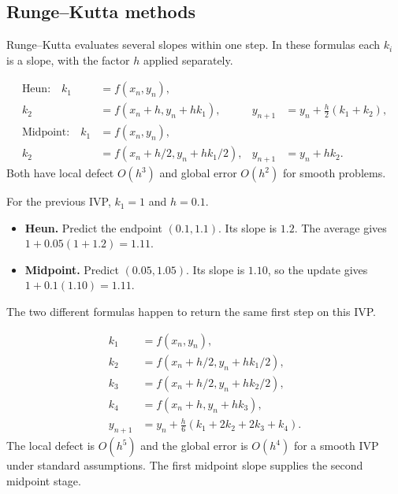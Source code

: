\documentclass[12pt,a4paper]{article}
\begin{document}
\subsection{Runge--Kutta methods}
Runge--Kutta evaluates several slopes within one step. In these formulas each $k_i$ is a slope, with the factor $h$ applied separately.

\begin{tcolorbox}[formulabox, title={Two second-order methods}]
\[
\begin{aligned}
\text{Heun:}\quad k_1&=f(x_n,y_n),\\
k_2&=f(x_n+h,y_n+hk_1),&
y_{n+1}&=y_n+\frac h2(k_1+k_2),\\[3pt]
\text{Midpoint:}\quad k_1&=f(x_n,y_n),\\
k_2&=f(x_n+h/2,y_n+hk_1/2),&
y_{n+1}&=y_n+hk_2.
\end{aligned}
\]
Both have local defect $O(h^3)$ and global error $O(h^2)$ for smooth problems.
\end{tcolorbox}

\begin{tcolorbox}[examplebox, title={One RK2 step using both forms}]
For the previous IVP, $k_1=1$ and $h=0.1$.
\begin{itemize}[leftmargin=*, itemsep=3pt, topsep=4pt]
  \item \textbf{Heun.} Predict the endpoint $(0.1,1.1)$. Its slope is $1.2$. The average gives $1+0.05(1+1.2)=1.11$.
  \item \textbf{Midpoint.} Predict $(0.05,1.05)$. Its slope is $1.10$, so the update gives $1+0.1(1.10)=1.11$.
\end{itemize}
The two different formulas happen to return the same first step on this IVP.
\end{tcolorbox}

\begin{tcolorbox}[formulabox, title={Classical fourth-order Runge--Kutta}]
\[
\begin{aligned}
k_1&=f(x_n,y_n),\\
k_2&=f(x_n+h/2,y_n+hk_1/2),\\
k_3&=f(x_n+h/2,y_n+hk_2/2),\\
k_4&=f(x_n+h,y_n+hk_3),\\
y_{n+1}&=y_n+\frac h6(k_1+2k_2+2k_3+k_4).
\end{aligned}
\]
The local defect is $O(h^5)$ and the global error is $O(h^4)$ for a smooth IVP under standard assumptions. The first midpoint slope supplies the second midpoint stage.
\end{tcolorbox}
\end{document}

